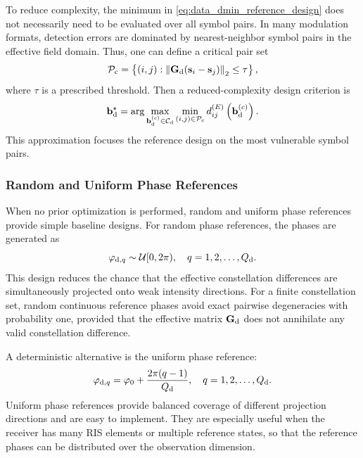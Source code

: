 \documentclass[journal]{IEEEtran}
\begin{document}
To reduce complexity, the minimum in \eqref{eq:data_dmin_reference_design} does not necessarily need to be evaluated over all symbol pairs. 
In many modulation formats, detection errors are dominated by nearest-neighbor symbol pairs in the effective field domain. 
Thus, one can define a critical pair set
\begin{equation}
\mathcal{P}_{\rm c}
=
\left\{
(i,j):
\left\|
\mathbf{G}_{\rm d}
(\mathbf{s}_i-\mathbf{s}_j)
\right\|_2
\leq \tau
\right\},
\label{eq:critical_pair_set}
\end{equation}
where $\tau$ is a prescribed threshold. 
Then a reduced-complexity design criterion is
\begin{equation}
\mathbf{b}_{\rm d}^{\star}
=
\arg\max_{\mathbf{b}_{\rm d}^{(c)}\in\mathcal{C}_{\rm d}}
\min_{(i,j)\in\mathcal{P}_{\rm c}}
d_{ij}^{(E)}
\left(
\mathbf{b}_{\rm d}^{(c)}
\right).
\label{eq:critical_pair_codebook_selection}
\end{equation}
This approximation focuses the reference design on the most vulnerable symbol pairs.

\subsubsection{Random and Uniform Phase References}

When no prior optimization is performed, random and uniform phase references provide simple baseline designs. 
For random phase references, the phases are generated as
\begin{equation}
\varphi_{{\rm d},q}
\sim
\mathcal{U}[0,2\pi),
\quad
q=1,2,\ldots,Q_{\rm d}.
\label{eq:data_random_phase_reference}
\end{equation}
This design reduces the chance that the effective constellation differences are simultaneously projected onto weak intensity directions. 
For a finite constellation set, random continuous reference phases avoid exact pairwise degeneracies with probability one, provided that the effective matrix $\mathbf{G}_{\rm d}$ does not annihilate any valid constellation difference.

A deterministic alternative is the uniform phase reference:
\begin{equation}
\varphi_{{\rm d},q}
=
\varphi_0+
\frac{2\pi(q-1)}{Q_{\rm d}},
\quad
q=1,2,\ldots,Q_{\rm d}.
\label{eq:data_uniform_phase_reference}
\end{equation}
Uniform phase references provide balanced coverage of different projection directions and are easy to implement. 
They are especially useful when the receiver has many RIS elements or multiple reference states, so that the reference phases can be distributed over the observation dimension.
\end{document}

